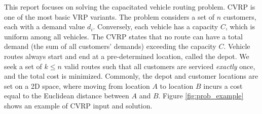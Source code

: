 \documentclass[12pt]{report}
\begin{document}
This report focuses on solving the capacitated vehicle routing problem. CVRP is one of the most basic VRP variants. The problem considers a set of $n$ customers, each with a demand value $d_i$. Conversely, each vehicle has a capacity $C$, which is uniform among all vehicles. The CVRP states that no route can have a total demand (the sum of all customers' demands) exceeding the capacity $C$. Vehicle routes always start and end at a pre-determined location, called the depot. We seek a set of $k \leq n$ valid routes such that all customers are serviced \textit{exactly} once, and the total cost is minimized. Commonly, the depot and customer locations are set on a 2D space, where moving from location $A$ to location $B$ incurs a cost equal to the Euclidean distance between $A$ and $B$. Figure \ref{fig:prob_example} shows an example of CVRP input and solution.
\end{document}
